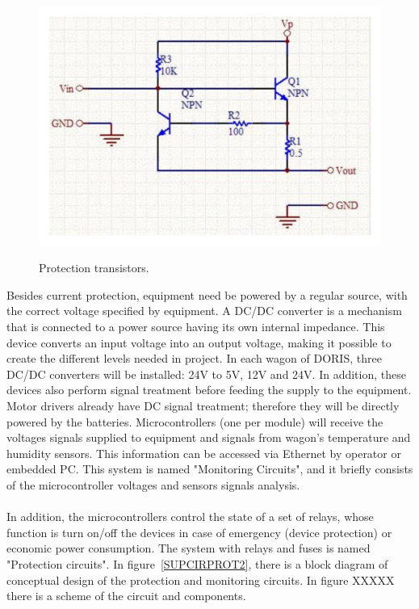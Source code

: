 \begin{figure}
  \centering
  \includegraphics[width=1\columnwidth]{figs/tables/SupCirProt.pdf}\\
  \caption[Protection transistors]{Protection transistors.}
  \label{FIG:SUPCIRPROT}
\end{figure}
Besides current protection, equipment need be powered by a regular source, with the correct voltage specified by equipment. A DC/DC converter is a mechanism that is connected to a power source having its own internal impedance. This device converts an input voltage into an output voltage, making it possible to create the different levels needed in project. In each wagon of DORIS, three DC/DC converters will be installed: 24V to 5V, 12V and 24V. In addition, these devices also perform signal treatment before feeding the supply to the equipment. Motor drivers already have DC signal treatment; therefore they will be directly powered by the batteries.
Microcontrollers (one per module) will receive the voltages signals supplied to equipment and signals from wagon's temperature and humidity sensors. This information can be accessed via Ethernet by operator or embedded PC. This system is named "Monitoring Circuits", and it briefly consists of the microcontroller voltages and sensors signals analysis.\\
\\
In addition, the microcontrollers control the state of a set of relays, whose function is turn on/off the devices in case of emergency (device protection) or economic power consumption. The system with relays and fuses is named "Protection circuits". In figure~\ref{SUPCIRPROT2}, there is a block diagram of conceptual design of the protection and monitoring circuits. In figure XXXXX there is a scheme of the circuit and components.
